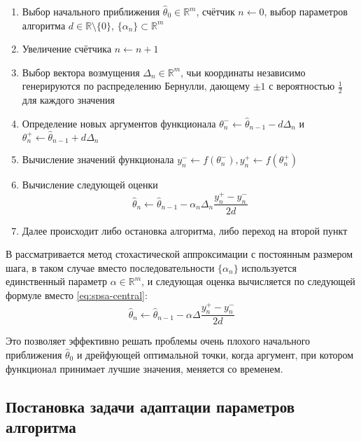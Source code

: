 \begin{enumerate}
	\item Выбор начального приближения $\hat{\theta}_0 \in \mathbb{R}^m$, счётчик $n \leftarrow 0$, выбор параметров алгоритма $d \in \mathbb{R} \setminus \{0\}$, $\{\alpha_n\} \subset \mathbb{R}^m$
	\item Увеличение счётчика $n \leftarrow n + 1$
	\item Выбор вектора возмущения $\Delta_n \in \mathbb{R}^m$, чьи координаты независимо генерируются по распределению Бернулли, дающему $\pm1$ с вероятностью $\frac{1}{2}$ для каждого значения
	\item Определение новых аргументов функционала $\theta_{n}^{-} \leftarrow \hat{\theta}_{n - 1} - d\Delta_{n}$ и $\theta_{n}^{+} \leftarrow \hat{\theta}_{n - 1} + d\Delta_{n}$
	\item Вычисление значений функционала $y_n^{-} \leftarrow f(\theta_{n}^{-}), y_n^{+} \leftarrow f(\theta_{n}^{+})$
	\item Вычисление следующей оценки
	\begin{equation} \label{eq:spsa-central}
		\hat{\theta}_n \leftarrow \hat{\theta}_{n - 1} - \alpha_n \Delta_{n} \frac{y_n^{+} - y_n^{-}}{2d}
	\end{equation}
	\item Далее происходит либо остановка алгоритма, либо переход на второй пункт
\end{enumerate}

В \cite{Kushner&Yin:2003, Borkar:2008, Granichin&Amelina:2015} рассматривается метод стохастической аппроксимации с постоянным размером шага, в таком случае вместо последовательности $\{\alpha_n\}$ используется единственный параметр $\alpha \in \mathbb{R}^m$, и следующая оценка вычисляется по следующей формуле вместо \eqref{eq:spsa-central}:
\begin{equation}
	\hat{\theta}_n \leftarrow \hat{\theta}_{n - 1} - \alpha \Delta \frac{y_n^{+} - y_n^{-}}{2d}
\end{equation}

Это позволяет эффективно решать проблемы очень плохого начального приближения $\hat{\theta}_0$ и дрейфующей оптимальной точки, когда аргумент, при котором функционал принимает лучшие значения, меняется со временем.



\subsection{Постановка задачи адаптации параметров алгоритма}
\label{subsec:task}

